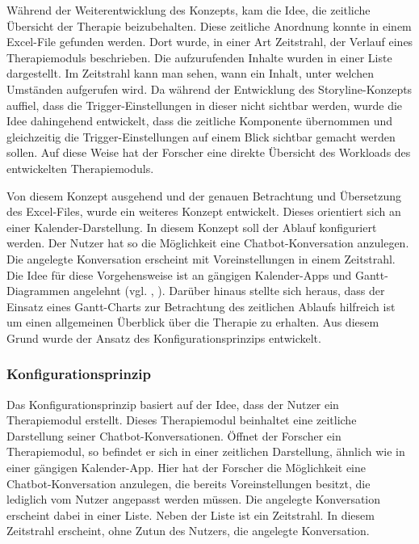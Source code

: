 Während der Weiterentwicklung des Konzepts, kam die Idee, die zeitliche Übersicht der Therapie beizubehalten. Diese zeitliche Anordnung konnte in einem Excel-File gefunden werden. Dort wurde, in einer Art Zeitstrahl, der Verlauf eines Therapiemoduls beschrieben. Die aufzurufenden Inhalte wurden in einer Liste dargestellt. Im Zeitstrahl kann man sehen, wann ein Inhalt, unter welchen Umständen aufgerufen wird. Da während der Entwicklung des Storyline-Konzepts auffiel, dass die Trigger-Einstellungen in dieser nicht sichtbar werden, wurde die Idee dahingehend entwickelt, dass die zeitliche Komponente übernommen und gleichzeitig die Trigger-Einstellungen auf einem Blick sichtbar gemacht werden sollen. Auf diese Weise hat der Forscher eine direkte Übersicht des Workloads des entwickelten Therapiemoduls. 

Von diesem Konzept ausgehend und der genauen Betrachtung und Übersetzung des Excel-Files, wurde ein weiteres Konzept entwickelt. Dieses orientiert sich an einer Kalender-Darstellung. In diesem Konzept soll der Ablauf konfiguriert werden. Der Nutzer hat so die Möglichkeit eine Chatbot-Konversation anzulegen. Die angelegte Konversation erscheint mit Voreinstellungen in einem Zeitstrahl. Die Idee für diese Vorgehensweise ist an gängigen Kalender-Apps und Gantt-Diagrammen angelehnt (vgl. \cite{GoogleKa75:online}, \cite{MailundK42:online}). Darüber hinaus stellte sich heraus, dass der Einsatz eines Gantt-Charts zur Betrachtung des zeitlichen Ablaufs hilfreich ist um einen allgemeinen Überblick über die Therapie zu erhalten. Aus diesem Grund wurde der Ansatz des Konfigurationsprinzips entwickelt. 

\subsubsection{Konfigurationsprinzip}
Das Konfigurationsprinzip basiert auf der Idee, dass der Nutzer ein Therapiemodul erstellt. Dieses Therapiemodul beinhaltet eine zeitliche Darstellung seiner Chatbot-Konversationen. Öffnet der Forscher ein Therapiemodul, so befindet er sich in einer zeitlichen Darstellung, ähnlich wie in einer gängigen Kalender-App. Hier hat der Forscher die Möglichkeit eine Chatbot-Konversation anzulegen, die bereits Voreinstellungen besitzt, die lediglich vom Nutzer angepasst werden müssen. Die angelegte Konversation erscheint dabei in einer Liste. Neben der Liste ist ein Zeitstrahl. In diesem Zeitstrahl erscheint, ohne Zutun des Nutzers, die angelegte Konversation.  



